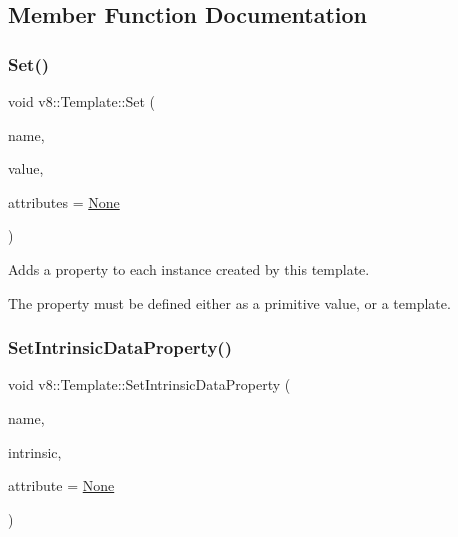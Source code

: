\subsection{Member Function Documentation}
\mbox{\label{classv8_1_1Template_a623b9f0cdd87dc861516f276cc9a7cfa}} 
\subsubsection{\texorpdfstring{Set()}{Set()}}
{\footnotesize\ttfamily void v8\+::\+Template\+::\+Set (\begin{DoxyParamCaption}\item[{\mbox{\hyperlink{classv8_1_1Local}{Local}}$<$ \mbox{\hyperlink{classv8_1_1Name}{Name}} $>$}]{name,  }\item[{\mbox{\hyperlink{classv8_1_1Local}{Local}}$<$ \mbox{\hyperlink{classv8_1_1Data}{Data}} $>$}]{value,  }\item[{\mbox{\hyperlink{namespacev8_a05f25f935e108a1ea2d150e274602b87}{Property\+Attribute}}}]{attributes = {\ttfamily \mbox{\hyperlink{namespacev8_a05f25f935e108a1ea2d150e274602b87a7ab4d58719c33b3ea2dfaefa29b111df}{None}}} }\end{DoxyParamCaption})}

Adds a property to each instance created by this template.

The property must be defined either as a primitive value, or a template. \mbox{\label{classv8_1_1Template_aef172ef714818a210d815de389a5ab77}} 
\subsubsection{\texorpdfstring{Set\+Intrinsic\+Data\+Property()}{SetIntrinsicDataProperty()}}
{\footnotesize\ttfamily void v8\+::\+Template\+::\+Set\+Intrinsic\+Data\+Property (\begin{DoxyParamCaption}\item[{\mbox{\hyperlink{classv8_1_1Local}{Local}}$<$ \mbox{\hyperlink{classv8_1_1Name}{Name}} $>$}]{name,  }\item[{Intrinsic}]{intrinsic,  }\item[{\mbox{\hyperlink{namespacev8_a05f25f935e108a1ea2d150e274602b87}{Property\+Attribute}}}]{attribute = {\ttfamily \mbox{\hyperlink{namespacev8_a05f25f935e108a1ea2d150e274602b87a7ab4d58719c33b3ea2dfaefa29b111df}{None}}} }\end{DoxyParamCaption})}

